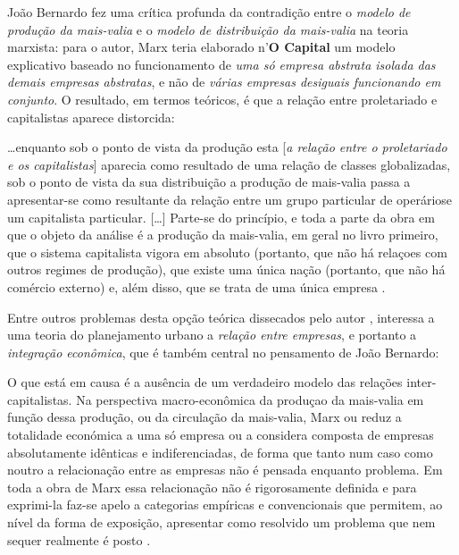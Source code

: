 João Bernardo fez uma crítica profunda da contradição entre o \textit{modelo de produção da mais-valia} e o \textit{modelo de distribuição da mais-valia} na teoria marxista: para o autor, Marx teria elaborado n'\textbf{O Capital} um modelo explicativo baseado no funcionamento de \textit{uma só empresa abstrata isolada das demais empresas abstratas}, e não de \textit{várias empresas desiguais funcionando em conjunto}. O resultado, em termos teóricos, é que a relação entre proletariado e capitalistas aparece distorcida: 

\begin{citacao}
\dots enquanto sob o ponto de vista da produção esta [\textit{a relação entre o proletariado e os capitalistas}] aparecia como resultado de uma relação de classes globalizadas, sob o ponto de vista da sua distribuição a produção de mais-valia passa a apresentar-se como resultante da relação entre um grupo particular de operáriose um capitalista particular. [\dots] Parte-se do princípio, e toda a parte da obra em que o objeto da análise é a produção da mais-valia, em geral no livro primeiro, que o sistema capitalista vigora em absoluto (portanto, que não há relaçoes com outros regimes de produção), que existe uma única nação (portanto, que não há comércio externo) e, além disso, que se trata de uma única empresa \cite[p.~10-11]{BERNARDO1977b}.
\end{citacao}

Entre outros problemas desta opção teórica dissecados pelo autor \cite[p.~7-21]{BERNARDO1977b}, interessa a uma teoria do planejamento urbano a \textit{relação entre empresas}, e portanto a \textit{integração econômica}, que é também central no pensamento de João Bernardo:

\begin{citacao}
O que está em causa é a ausência de um verdadeiro modelo das relações inter-capitalistas. Na perspectiva macro-econômica da produçao da mais-valia em função dessa produção, ou da circulação da mais-valia, Marx ou reduz a totalidade económica a uma só empresa ou a considera composta de empresas absolutamente idênticas e indiferenciadas, de forma que tanto num caso como noutro a relacionação entre as empresas não é pensada enquanto problema. Em toda a obra de Marx essa relacionação não é rigorosamente definida e para exprimi-la faz-se apelo a categorias empíricas e convencionais que permitem, ao nível da forma de exposição, apresentar como resolvido um problema que nem sequer realmente é posto \cite[p.~21]{BERNARDO1977b}.
\end{citacao}

